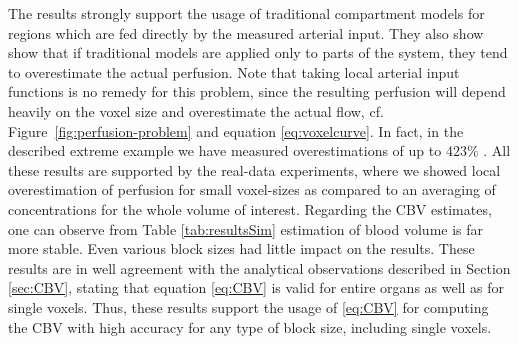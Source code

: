 \documentclass[journal,twocolumn]{IEEEtran}
\begin{document}
	The results strongly support the usage of traditional compartment models for regions which are fed directly by the measured arterial input.
	They also show show that if traditional models are applied only to parts of the system, they tend to overestimate the actual perfusion.
	Note that taking local arterial input functions is no remedy for this problem, since the resulting perfusion will depend heavily on the voxel size and overestimate the actual flow, cf. Figure~\ref{fig:perfusion-problem} and equation \eqref{eq:voxelcurve}.
	In fact, in the described extreme example we have measured overestimations of up to $423\%$ .
	All these results are supported by the real-data experiments, where we showed local overestimation of perfusion for small voxel-sizes as compared to an averaging of concentrations for the whole volume of interest.
	Regarding the CBV estimates, one can observe from Table \ref{tab:resultsSim} estimation of blood volume is far more stable. 
	Even various block sizes had little impact on the results. 
	These results are in well agreement with the analytical observations described in Section \ref{sec:CBV}, stating that equation \eqref{eq:CBV} is valid for entire organs as well as for single voxels. 
	Thus, these results support the usage of \eqref{eq:CBV} for computing the CBV with high accuracy for any type of block size, including single voxels.
	
	
\end{document}
